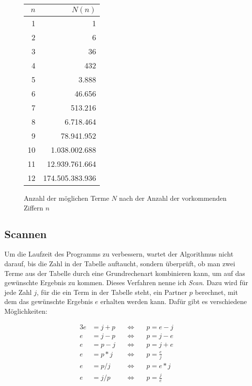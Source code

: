 \documentclass[a4paper,10pt,ngerman]{scrartcl}
\begin{document}
\begin{figure}[]
  \centering
  \begin{tabular}{|r|r|}
  $n$ & $N(n)$ \\ \hline
  1 & 1 \\ \hline
  2 & 6 \\ \hline
  3 & 36 \\ \hline
  4 & 432 \\ \hline
  5 & 3.888 \\ \hline
  6 & 46.656 \\ \hline
  7 & 513.216 \\ \hline
  8 & 6.718.464 \\ \hline
  9 & 78.941.952 \\ \hline
  10 & 1.038.002.688 \\ \hline
  11 & 12.939.761.664 \\ \hline
  12 & 174.505.383.936 \\ 
  \end{tabular}
  \caption{Anzahl der möglichen Terme $N$ nach der Anzahl der vorkommenden Ziffern $n$}
  \label{fig:anzahl-terme}
\end{figure}

\subsection{Scannen}
\label{sec:idea:scan}
Um die Laufzeit des Programms zu verbessern, wartet der Algorithmus nicht darauf, bis die Zahl in der Tabelle auftaucht, sondern überprüft, ob man zwei Terme aus der Tabelle durch eine Grundrechenart kombinieren kann, um auf das gewünschte Ergebnis zu kommen.
Dieses Verfahren nenne ich \textit{Scan}.
Dazu wird für jede Zahl $j$, für die ein Term in der Tabelle steht, ein Partner $p$ berechnet, mit dem das gewünschte Ergebnis $e$ erhalten werden kann.
Dafür gibt es verschiedene Möglichkeiten:

\begin{alignat*}{3}
  e &= j + p \quad &\Leftrightarrow& \quad p = e - j \\
  e &= j - p \quad &\Leftrightarrow& \quad p = j - e \\
  e &= p - j \quad &\Leftrightarrow& \quad p = j + e \\
  e &= p * j \quad &\Leftrightarrow& \quad p = \frac{e}{j} \\
  e &= p / j \quad &\Leftrightarrow& \quad p = e * j \\
  e &= j / p \quad &\Leftrightarrow& \quad p = \frac{j}{e}
\end{alignat*}
\end{document}
